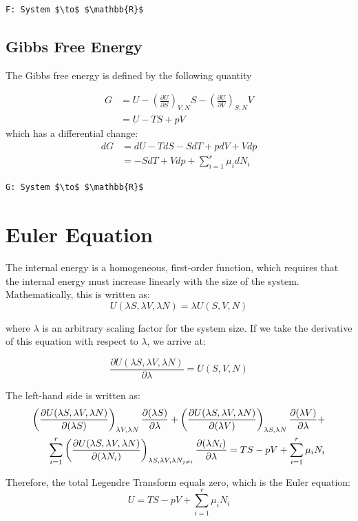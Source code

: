 \documentclass[book.tex]{subfiles}
\begin{document}
\begin{lstlisting}
F: System $\to$ $\mathbb{R}$
\end{lstlisting}

\subsection{Gibbs Free Energy}
The Gibbs free energy is defined by the following quantity


\begin{align}
G &= U - \left(\frac{\partial U}{\partial S}\right)_{V,N}S - \left(\frac{\partial U}{\partial V}\right)_{S,N}V \\
&= U - TS + pV
\end{align}
which has a differential change:
\begin{align}
dG &= dU -TdS - SdT + pdV +Vdp \\
&= -SdT +Vdp + \sum_{i=1}^r\mu_idN_i 
\end{align}

\begin{lstlisting}
G: System $\to$ $\mathbb{R}$
\end{lstlisting}

\section{Euler Equation}
The internal energy is a homogeneous, first-order function, which
requires that the internal energy must increase linearly with the size
of the system. Mathematically, this is written as:
\begin{equation}
U(\lambda S,\lambda V, \lambda N) = \lambda U(S,V,N)
\end{equation}

where $\lambda$ is an arbitrary scaling factor for the system size. If we take the derivative of this equation with respect to $\lambda$, we arrive at:

\begin{equation}
\frac{\partial U(\lambda S,\lambda V, \lambda N)}{\partial \lambda} = U(S,V,N)
\end{equation}

The left-hand side is written as:
\begin{align}
\left(\frac{\partial U(\lambda S,\lambda V, \lambda N)}{\partial (\lambda S)}\right)_{\lambda V, \lambda N} \frac{\partial (\lambda S)}{\partial \lambda} + \left(\frac{\partial U(\lambda S,\lambda V, \lambda N)}{\partial (\lambda V)}\right)_{\lambda S, \lambda N} \frac{\partial (\lambda V)}{\partial \lambda} + \notag \\
\sum_{i=1}^r\left(\frac{\partial U(\lambda S,\lambda V, \lambda N)}{\partial (\lambda N_i)}\right)_{\lambda S, \lambda V, \lambda N_{j \neq i}} \frac{\partial (\lambda N_i)}{\partial \lambda}  = TS - pV + \sum_{i=1}^r\mu_iN_i 
\end{align}

Therefore, the total Legendre Transform equals zero, which is the Euler equation:
\begin{equation}\label{Euler equation}
U = TS -pV +\sum_{i=1}^r\mu_iN_i
\end{equation}
\end{document}
